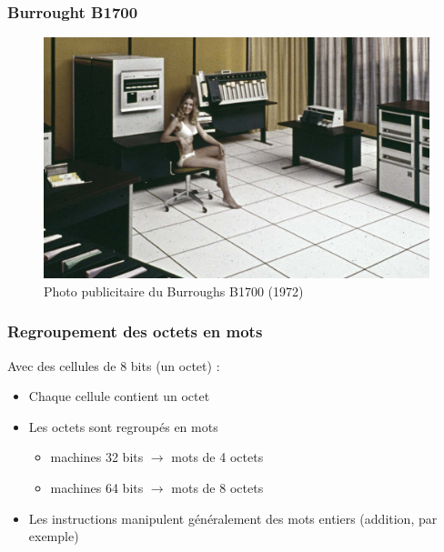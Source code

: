\begin{frame}
 \frametitle{Burrought B1700}
 \begin{figure}[htbp]
\begin{center}
\includegraphics[width=.9\textwidth]{../illustration/BurroughtB1700.jpg}
\caption{Photo publicitaire du Burroughs B1700 (1972)\cite{B1700}}
\label{default}
\end{center}
\end{figure}
\end{frame}

\begin{frame}
\frametitle{Regroupement des octets en mots}
Avec des cellules de 8 bits (un octet) :
\begin{itemize}
\item Chaque cellule contient un octet
\item Les octets sont regroupés en mots
\begin{itemize}
\item machines 32 bits $\rightarrow$ mots de 4 octets
\item machines 64 bits $\rightarrow$ mots de 8 octets
\end{itemize}
\item Les instructions manipulent généralement des mots entiers (addition, par exemple)
\end{itemize}
\end{frame}


